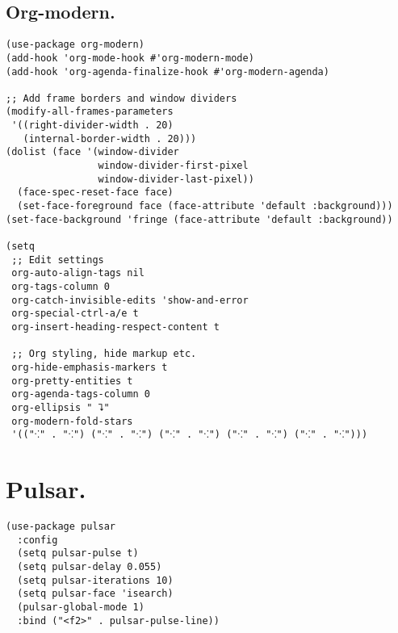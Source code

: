 \documentclass[11pt]{article}
\begin{document}
\subsection{Org-modern.}
\label{sec:org4ad7676}
\begin{verbatim}
(use-package org-modern)
(add-hook 'org-mode-hook #'org-modern-mode)
(add-hook 'org-agenda-finalize-hook #'org-modern-agenda)

;; Add frame borders and window dividers
(modify-all-frames-parameters
 '((right-divider-width . 20)
   (internal-border-width . 20)))
(dolist (face '(window-divider
                window-divider-first-pixel
                window-divider-last-pixel))
  (face-spec-reset-face face)
  (set-face-foreground face (face-attribute 'default :background)))
(set-face-background 'fringe (face-attribute 'default :background))

(setq
 ;; Edit settings
 org-auto-align-tags nil
 org-tags-column 0
 org-catch-invisible-edits 'show-and-error
 org-special-ctrl-a/e t
 org-insert-heading-respect-content t

 ;; Org styling, hide markup etc.
 org-hide-emphasis-markers t
 org-pretty-entities t
 org-agenda-tags-column 0
 org-ellipsis " ⮧"
 org-modern-fold-stars
 '(("⁖" . "⁖") ("⁖" . "⁖") ("⁖" . "⁖") ("⁖" . "⁖") ("⁖" . "⁖")))
\end{verbatim}
\section{Pulsar.}
\label{sec:org157fc0d}
\begin{verbatim}
(use-package pulsar
  :config
  (setq pulsar-pulse t)
  (setq pulsar-delay 0.055)
  (setq pulsar-iterations 10)
  (setq pulsar-face 'isearch)
  (pulsar-global-mode 1)
  :bind ("<f2>" . pulsar-pulse-line))
\end{verbatim}
\end{document}
